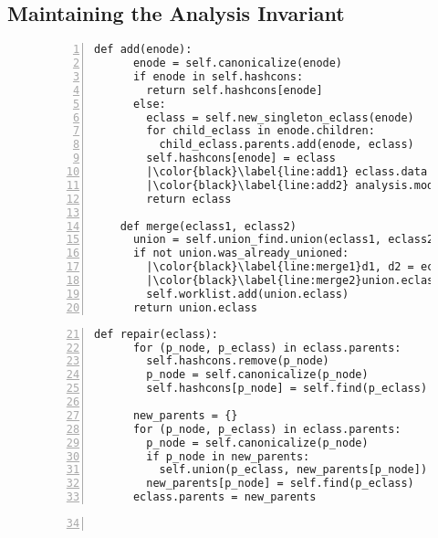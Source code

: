 \subsection{Maintaining the Analysis Invariant}


\begin{figure}
  \begin{minipage}[t]{0.47\linewidth}
    \begin{lstlisting}[gobble=4, numbers=left, numberstyle=\color{black}, basicstyle=\scriptsize\ttfamily\color{black!40}, escapechar=|,
   xleftmargin=13pt,
   numbersep=7pt,
]
    def add(enode):
      enode = self.canonicalize(enode)
      if enode in self.hashcons:
        return self.hashcons[enode]
      else:
        eclass = self.new_singleton_eclass(enode)
        for child_eclass in enode.children:
          child_eclass.parents.add(enode, eclass)
        self.hashcons[enode] = eclass
        |\color{black}\label{line:add1} eclass.data = analysis.make(enode)|
        |\color{black}\label{line:add2} analysis.modify(eclass)|
        return eclass

    def merge(eclass1, eclass2)
      union = self.union_find.union(eclass1, eclass2)
      if not union.was_already_unioned:
        |\color{black}\label{line:merge1}d1, d2 = eclass1.data, eclass2.data|
        |\color{black}\label{line:merge2}union.eclass.data = analysis.join(d1, d2)|
        self.worklist.add(union.eclass)
      return union.eclass
    \end{lstlisting}
  \end{minipage}
  \hfill
  \begin{minipage}[t]{0.47\linewidth}
    \begin{lstlisting}[gobble=4, numbers=left, firstnumber=21, numberstyle=\color{black}, basicstyle=\scriptsize\ttfamily\color{black!40}, escapechar=|,
    numbersep=5pt,
]
    def repair(eclass):
      for (p_node, p_eclass) in eclass.parents:
        self.hashcons.remove(p_node)
        p_node = self.canonicalize(p_node)
        self.hashcons[p_node] = self.find(p_eclass)

      new_parents = {}
      for (p_node, p_eclass) in eclass.parents:
        p_node = self.canonicalize(p_node)
        if p_node in new_parents:
          self.union(p_eclass, new_parents[p_node])
        new_parents[p_node] = self.find(p_eclass)
      eclass.parents = new_parents
    \end{lstlisting}
    \vspace{-3mm}
    \begin{lstlisting}[gobble=4, numbers=left, firstnumber=34, basicstyle=\scriptsize\ttfamily, escapechar=|,
    numbersep=5pt,
]


\end{lstlisting}
\end{minipage}
\end{figure}
